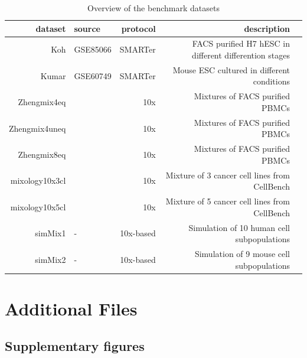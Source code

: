 \documentclass{bmcart}
\begin{document}
\begin{backmatter}
\begin{table}[h!]
\caption{Overview of the benchmark datasets}
\label{tab:table1}
\begin{tabular}{rlrrl}
  \hline
dataset & source & protocol & description \\ 
  \hline
Koh & GSE85066 & SMARTer & FACS purified H7 hESC in different differention stages \\ 
  Kumar & GSE60749 & SMARTer & Mouse ESC cultured in different conditions \\ 
  Zhengmix4eq & \citep{duoClustering2018} & 10x & Mixtures of FACS purified PBMCs \\ 
  Zhengmix4uneq & \citep{duoClustering2018} & 10x & Mixtures of FACS purified PBMCs \\ 
  Zhengmix8eq & \citep{duoClustering2018} & 10x & Mixtures of FACS purified PBMCs \\ 
  mixology10x3cl & \cite{tianMixology2018} & 10x & Mixture of 3  cancer cell lines from CellBench \\ 
  mixology10x5cl & \cite{tianMixology2018} & 10x & Mixture of 5 cancer cell lines from CellBench \\ 
  simMix1 & - & 10x-based & Simulation of 10 human cell subpopulations \\
  simMix2 & - & 10x-based & Simulation of 9 mouse cell subpopulations \\
   \hline
\end{tabular}
\end{table}


\section*{Additional Files}
  \subsection*{Supplementary figures}

\end{backmatter}
\end{document}
